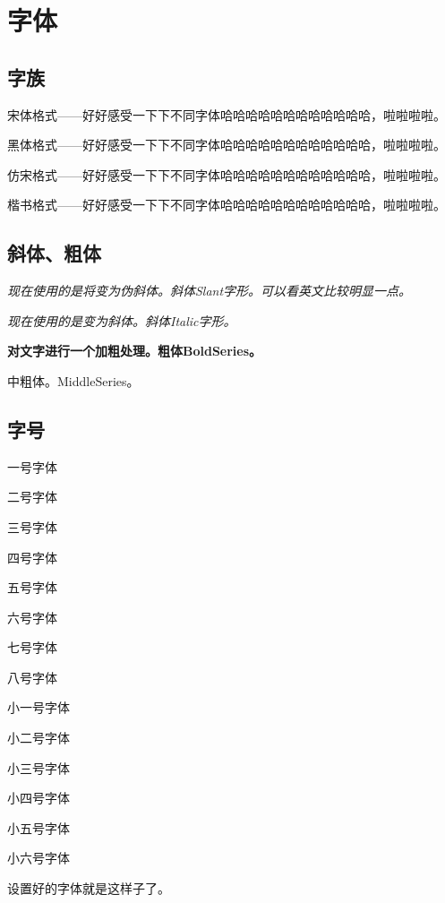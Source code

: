 \documentclass[10pt,UTF8]{ctexart}     %
\begin{document}
	\section{字体}
	\subsection{字族}
	\songti 宋体格式——好好感受一下下不同字体哈哈哈哈哈哈哈哈哈哈哈哈，啦啦啦啦。 \par
	\heiti 黑体格式——好好感受一下下不同字体哈哈哈哈哈哈哈哈哈哈哈哈，啦啦啦啦。 \par
	\fangsong 仿宋格式——好好感受一下下不同字体哈哈哈哈哈哈哈哈哈哈哈哈，啦啦啦啦。\par
	\kaishu 楷书格式——好好感受一下下不同字体哈哈哈哈哈哈哈哈哈哈哈哈，啦啦啦啦。\par
	
	
	\subsection{斜体、粗体}
	\textsl{现在使用的是将变为伪斜体。斜体Slant字形。可以看英文比较明显一点。} \par
	\textit{现在使用的是变为斜体。斜体Italic字形。}\par
	\textbf{对文字进行一个加粗处理。粗体BoldSeries。} \par
	\textmd{中粗体。MiddleSeries。} \par
	
	\subsection{字号}
	
	 一号字体 \par
	 二号字体 \par
	 三号字体 \par
	 四号字体 \par
	 五号字体 \par
	 六号字体 \par
	 七号字体 \par
	 八号字体 \par
	 小一号字体 \par
	 小二号字体 \par
	 小三号字体 \par
	 小四号字体 \par
	 小五号字体 \par
	 小六号字体 \par
	\fontsize{12}{\baselineskip}{\rmfamily}
	设置好的字体就是这样子了。\par
\end{document}
